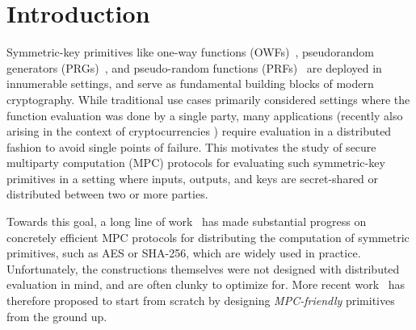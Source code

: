 
\section{Introduction}
\label{sec:introduction}



\medskip

Symmetric-key primitives like one-way functions (OWFs)~\cite{?},
 pseudorandom generators (PRGs)~\cite{blum1984-prg,yao1982-prg}, 
and pseudo-random functions (PRFs)~\cite{goldreich1984-prf} are deployed in innumerable settings, and serve as fundamental building blocks of modern cryptography. While traditional use cases primarily considered settings where the function evaluation was done by a single party, many applications (recently also arising in the context of cryptocurrencies ) require evaluation in a distributed fashion to avoid single points of failure. This motivates the study of secure multiparty computation (MPC) protocols for evaluating such symmetric-key primitives in a setting where inputs, outputs, and keys are secret-shared or distributed between two or more parties.

Towards this goal, a long line of work~\cite{damgard2010-aes, pinkas2009-aes, wang2017-mpc} has made substantial progress on concretely efficient MPC protocols for distributing the computation of symmetric primitives, such as AES or SHA-256, which are widely used in practice. Unfortunately, the constructions themselves were not designed with distributed evaluation in mind, and are often clunky to optimize for. More recent work~\cite{albrecht2015-lowmc, grassi2016-mpcfriendly, boneh2018-darkmatter} has therefore proposed to start from scratch by designing \textit{MPC-friendly} primitives from the ground up. 

